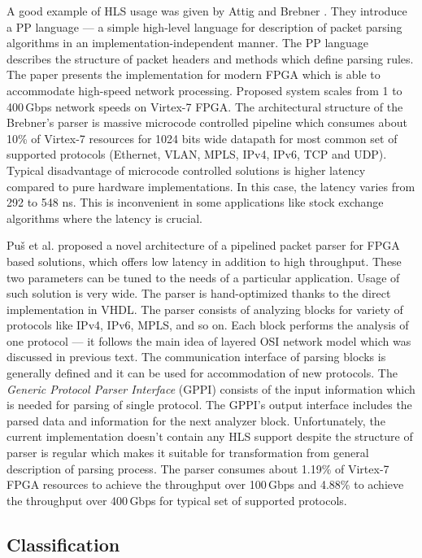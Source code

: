 A good example of HLS usage was given by Attig and Brebner \cite{AttigBrebner}. 
They introduce a PP language --- a simple high-level language for description
of packet parsing algorithms in an implementation-independent manner. 
The PP language describes the structure of packet headers and methods which define parsing rules.
The paper presents the implementation for modern FPGA which is able to accommodate high-speed network processing. 
Proposed system scales from 1 to 400\,Gbps network speeds on Virtex-7 FPGA. 
The architectural structure of the Brebner's parser is massive microcode controlled pipeline 
which consumes about 10\% of Virtex-7 resources for 1024 bits wide datapath for most common set of supported protocols 
(Ethernet, VLAN, MPLS, IPv4, IPv6, TCP and UDP). Typical disadvantage of microcode controlled solutions
is higher latency compared to pure hardware implementations. In this case, the latency varies from 292 to 548 ns.
This is inconvenient in some applications like stock exchange algorithms where the latency is crucial.  

Pu\v{s} et al. \cite{PusKekelyHfem2} proposed a novel architecture of a pipelined packet parser for FPGA based solutions, which offers 
low latency in addition to high throughput. 
These two parameters can be tuned to the needs of a particular application. Usage of such solution is very wide. The parser is 
hand-optimized thanks to the direct implementation in VHDL. 
The parser consists of analyzing blocks for variety of protocols like IPv4, IPv6, MPLS, and so on. 
Each block performs the analysis of one protocol --- it follows the main idea of layered OSI network model which was discussed in previous text. 
The communication interface of parsing blocks is generally defined and it can be used for accommodation of new protocols.
The \textit{Generic Protocol Parser Interface} (GPPI) consists of the input information which is 
needed for parsing of single protocol. The GPPI's output interface includes the parsed data and information for the next analyzer block. 
Unfortunately, the current implementation doesn't contain any HLS support despite the structure of parser is regular which makes it suitable for 
transformation from general description of parsing process. 
The parser consumes about 1.19\% of Virtex-7 FPGA resources to achieve the throughput over 100\,Gbps and 4.88\% to achieve the throughput 
over 400\,Gbps for typical set of supported protocols.

\subsection{Classification}
\label{sec:classification}

